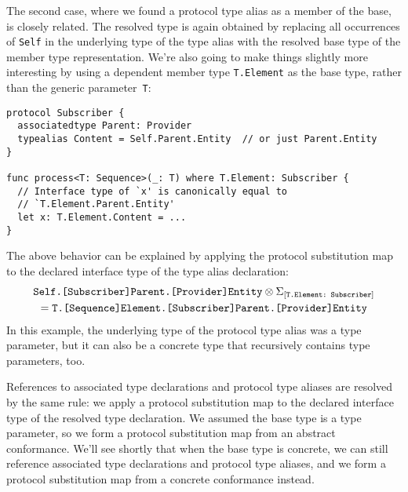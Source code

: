 \documentclass[../generics]{subfiles}
\begin{document}
The second case, where we found a protocol type alias as a member of the base, is closely related. The resolved type is again obtained by replacing all occurrences of \texttt{Self} in the underlying type of the type alias with the resolved base type of the member type representation. We're also going to make things slightly more interesting by using a dependent member type \texttt{T.Element} as the base type, rather than the generic parameter~\texttt{T}:
\begin{Verbatim}
protocol Subscriber {
  associatedtype Parent: Provider
  typealias Content = Self.Parent.Entity  // or just Parent.Entity
}

func process<T: Sequence>(_: T) where T.Element: Subscriber {
  // Interface type of `x' is canonically equal to
  // `T.Element.Parent.Entity'
  let x: T.Element.Content = ...
}
\end{Verbatim}
The above behavior can be explained by applying the protocol substitution map to the declared interface type of the type alias declaration:
\begin{multline*}
\texttt{Self.[Subscriber]Parent.[Provider]Entity}\otimes\Sigma_{[\texttt{T.Element:~Subscriber}]}\\
=\texttt{T.[Sequence]Element.[Subscriber]Parent.[Provider]Entity}
\end{multline*}
In this example, the underlying type of the protocol type alias was a type parameter, but it can also be a concrete type that recursively contains type parameters, too.

\smallskip

References to associated type declarations and protocol type aliases are resolved by the same rule: we apply a protocol substitution map to the declared interface type of the resolved type declaration. We assumed the base type is a type parameter, so we form a protocol substitution map from an abstract conformance. We'll see shortly that when the base type is concrete, we can still reference associated type declarations and protocol type aliases, and we form a protocol substitution map from a concrete conformance instead.
\end{document}
